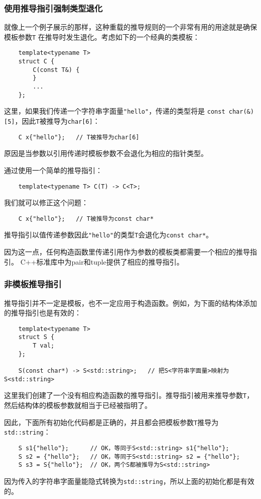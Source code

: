 \subsubsection{使用推导指引强制类型退化}\label{ch9.2.1}
就像上一个例子展示的那样，这种重载的推导规则的一个非常有用的用途就是确保模板参数\texttt{T}
在推导时发生退化。考虑如下的一个经典的类模板：
\begin{lstlisting}
    template<typename T>
    struct C {
        C(const T&) {
        }
        ...
    };
\end{lstlisting}
这里，如果我们传递一个字符串字面量\texttt{"hello"}，传递的类型将是
\texttt{const char(\&)[5]}，因此\texttt{T}被推导为\texttt{char[6]}：
\begin{lstlisting}
    C x{"hello"};   // T被推导为char[6]
\end{lstlisting}
原因是当参数以引用传递时模板参数不会退化为相应的指针类型。

通过使用一个简单的推导指引：
\begin{lstlisting}
    template<typename T> C(T) -> C<T>;
\end{lstlisting}
我们就可以修正这个问题：
\begin{lstlisting}
    C x{"hello"};   // T被推导为const char*
\end{lstlisting}
推导指引以值传递参数因此\texttt{"hello"}的类型\texttt{T}会退化为\texttt{const char*}。

因为这一点，任何构造函数里传递引用作为参数的模板类都需要一个相应的推导指引。
C++标准库中为pair和tuple提供了相应的推导指引。

\subsubsection{非模板推导指引}
推导指引并不一定是模板，也不一定应用于构造函数。例如，为下面的结构体添加的推导指引也是有效的：
\begin{lstlisting}
    template<typename T>
    struct S {
        T val;
    };

    S(const char*) -> S<std::string>;   // 把S<字符串字面量>映射为S<std::string>
\end{lstlisting}
这里我们创建了一个没有相应构造函数的推导指引。推导指引被用来推导参数\texttt{T}，
然后结构体的模板参数就相当于已经被指明了。

因此，下面所有初始化代码都是正确的，并且都会把模板参数\texttt{T}推导为\texttt{std::string}：
\begin{lstlisting}
    S s1{"hello"};      // OK，等同于S<std::string> s1{"hello"};
    S s2 = {"hello"};   // OK，等同于S<std::string> s2 = {"hello"};
    S s3 = S{"hello"};  // OK，两个S都被推导为S<std::string>
\end{lstlisting}
因为传入的字符串字面量能隐式转换为\texttt{std::string}，所以上面的初始化都是有效的。

